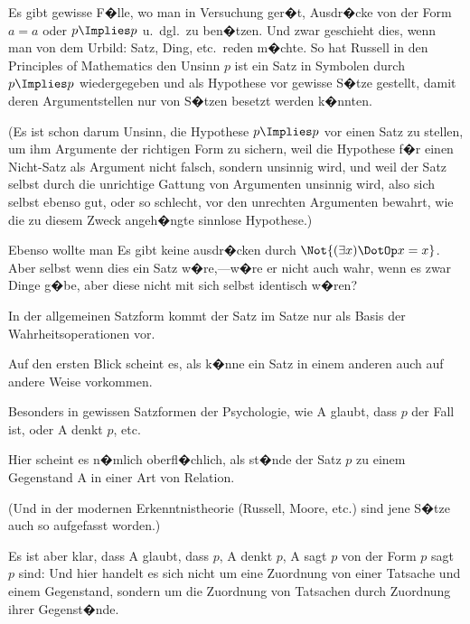 {Es gibt gewisse F�lle, wo man in Versuchung
ger�t, Ausdr�cke von der Form \glqq{}$a = a$\grqq{} oder \glqq{}$p \Implies p$\grqq{}
u.~dgl.\ zu ben�tzen. Und zwar geschieht dies,
wenn man von dem Urbild: Satz, Ding, etc.\ reden
m�chte. So hat Russell in den \glqq{}Principles of
Mathematics\grqq{} den Unsinn \glqq{}$p$ ist ein Satz\grqq{} in Symbolen
durch \glqq{}$p \Implies p$\grqq{} wiedergegeben und als Hypothese
vor gewisse S�tze gestellt, damit deren
Argumentstellen nur von S�tzen besetzt werden
k�nnten.

(Es ist schon darum Unsinn, die Hypothese
$p \Implies p$ vor einen Satz zu stellen, um ihm Argumente
der richtigen Form zu sichern, weil die Hypothese
f�r einen Nicht-Satz als Argument nicht falsch,
sondern unsinnig wird, und weil der Satz selbst
durch die unrichtige Gattung von Argumenten
unsinnig wird, also sich selbst ebenso gut, oder so
schlecht, vor den unrechten Argumenten bewahrt,
wie die zu diesem Zweck angeh�ngte sinnlose
Hypothese.)}


{Ebenso wollte man \glqq{}Es gibt keine \grqq{} ausdr�cken
durch \glqq{}$\Not{(\exists x) \DotOp x = x}$\grqq{}. Aber selbst wenn
dies ein Satz w�re,---w�re er nicht auch wahr, wenn
es zwar \glqq{}Dinge g�be\grqq{}, aber diese nicht mit sich
selbst identisch w�ren?}


{In der allgemeinen Satzform kommt der Satz im
Satze nur als Basis der Wahrheitsoperationen vor.}


{Auf den ersten Blick scheint es, als k�nne ein Satz
in einem anderen auch auf andere Weise vorkommen.

Besonders in gewissen Satzformen der Psychologie,
wie \glqq{}A glaubt, dass $p$ der Fall ist\grqq{}, oder
\glqq{}A denkt $p$\grqq{}, etc.

Hier scheint es n�mlich oberfl�chlich, als st�nde
der Satz $p$ zu einem Gegenstand A in einer Art
von Relation.

(Und in der modernen Erkenntnistheorie (Russell,
Moore, etc.) sind jene S�tze auch so aufgefasst
worden.)}


{Es ist aber klar, dass \glqq{}A glaubt, dass $p$\grqq{}, \glqq{}A
denkt $p$\grqq{}, \glqq{}A sagt $p$\grqq{} von der Form \glqq{}\glq{}$p$\grq{} sagt $p$\grqq{} sind:
Und hier handelt es sich nicht um eine Zuordnung
von einer Tatsache und einem Gegenstand, sondern
um die Zuordnung von Tatsachen durch Zuordnung
ihrer Gegenst�nde.}


